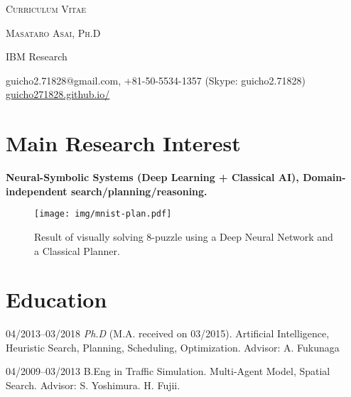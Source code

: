 \documentclass[letterpaper,11pt]{article}
\begin{document}
\pagestyle{empty}

\begin{center}
{\huge\textsc{Curriculum Vitae}}
\vspace{0.7\baselineskip}

{\Large\textsc{Masataro Asai, Ph.D}}
\vspace{0.5\baselineskip}

\small
{
IBM Research
}


 guicho2.71828@gmail.com, +81-50-5534-1357 (Skype: guicho2.71828) \url{guicho271828.github.io/}
\end{center}

\section{Main Research Interest}

\textbf{Neural-Symbolic Systems (Deep Learning + Classical AI), Domain-independent search/planning/reasoning.}

\begin{figure}[h]
 \centering
 \texttt{[image: img/mnist-plan.pdf]}
 \caption{Result of visually solving 8-puzzle using a Deep Neural Network and a Classical Planner. \cite{Asai2018}}
\end{figure}

\section{Education}

\begin{CV}
 \item[04/2013--03/2018] \textit{Ph.D} (M.A. received on 03/2015).
 Artificial Intelligence, Heuristic Search, Planning, Scheduling, Optimization.
 {\small %
 Advisor: A. Fukunaga}

 \item[04/2009--03/2013] B.Eng in Traffic Simulation.
 Multi-Agent Model, Spatial Search.
 {\small %
 Advisor: S. Yoshimura. H. Fujii.}
\end{CV}
\end{document}
